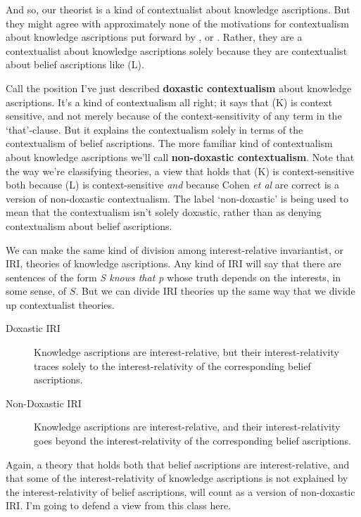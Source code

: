 \noindent And so, our theorist is a kind of contextualist about knowledge ascriptions. But they might agree with approximately none of the motivations for contextualism about knowledge ascriptions put forward by \cite{Cohen1988}, \cite{DeRose1995} or \cite{Lewis1996b}. Rather, they are a contextualist about knowledge ascriptions solely because they are contextualist about belief ascriptions like (L).

Call the position I've just described \textbf{doxastic contextualism} about knowledge ascriptions. It's a kind of contextualism all right; it says that (K) is context sensitive, and not merely because of the context-sensitivity of any term in the `that'-clause. But it explains the contextualism solely in terms of the contextualism of belief ascriptions. The more familiar kind of contextualism about knowledge ascriptions we'll call \textbf{non-doxastic contextualism}. Note that the way we're classifying theories, a view that holds that (K) is context-sensitive both because (L) is context-sensitive \textit{and} because Cohen \textit{et al} are correct is a version of non-doxastic contextualism. The label `non-doxastic' is being used to mean that the contextualism isn't solely doxastic, rather than as denying contextualism about belief ascriptions.

We can make the same kind of division among interest-relative invariantist, or IRI, theories of knowledge ascriptions. Any kind of IRI will say that there are sentences of the form \textit{S knows that p} whose truth depends on the interests, in some sense, of $S$. But we can divide IRI theories up the same way that we divide up contextualist theories.

\begin{description}
\item[Doxastic IRI] Knowledge ascriptions are interest-relative, but their interest-rela\-tivity traces solely to the interest-relativity of the corresponding belief ascriptions.
\item[Non-Doxastic IRI] Knowledge ascriptions are interest-relative, and their interest-relativity goes beyond the interest-relativity of the corresponding belief ascriptions.
\end{description}

\noindent Again, a theory that holds both that belief ascriptions are interest-relative, and that some of the interest-relativity of knowledge ascriptions is not explained by the interest-relativity of belief ascriptions, will count as a version of non-doxastic IRI. I'm going to defend a view from this class here.

